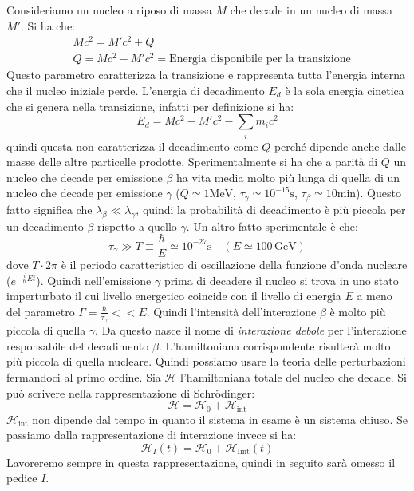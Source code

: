 Consideriamo un nucleo a riposo di massa $M$ che decade in un nucleo di massa 
$M'$. Si ha che:
\begin{align*}
&Mc^2=M'c^2+Q\\
&Q=Mc^2-M'c^2=\text{Energia disponibile per la transizione}
\end{align*}
Questo parametro caratterizza la transizione e rappresenta tutta l'energia 
interna che il nucleo iniziale perde. L'energia di decadimento $E_d$ è la sola 
energia cinetica
che si genera nella transizione, infatti per definizione si ha:
\[
E_d=Mc^2-M'c^2-\sum_i m_ic^2
\]
quindi questa non caratterizza il decadimento come $Q$ perché dipende anche 
dalle masse delle altre particelle prodotte. Sperimentalmente si ha che a 
parità di $Q$ un nucleo che decade
per emissione $\beta$ ha vita media molto più lunga di quella di un nucleo che 
decade per emissione $\gamma$ ($Q\simeq1\si{\mega\electronvolt}$, 
$\tau_{\gamma}\simeq10^{-15}\si{\second}$,
$\tau_{\beta}\simeq10\text{min}$).
Questo fatto significa che $\lambda_{\beta}\ll\lambda_{\gamma}$, quindi la 
probabilità di decadimento è più piccola per un decadimento $\beta$ rispetto 
a quello $\gamma$.
Un altro fatto sperimentale è che:
\[
\tau_{\gamma}\gg 
T\equiv\frac{\hbar}{E}\simeq10^{-27}\si{\second}\quad(E\simeq100\,
\si{\giga\electronvolt})
\]
dove $T\cdot2\pi$ è il periodo caratteristico di oscillazione della funzione 
d'onda nucleare ($e^{-\frac{i}{\hbar}Et}$). Quindi nell'emissione $\gamma$ 
prima di decadere il nucleo
si trova in uno stato imperturbato il cui livello energetico coincide con il 
livello di energia $E$ a meno del parametro 
$\Gamma=\frac{\hbar}{\tau_{\gamma}}<<E$. Quindi l'intensità
dell'interazione $\beta$ è molto più piccola di quella $\gamma$. Da questo 
nasce il nome di \textit{interazione debole} per l'interazione responsabile del 
decadimento $\beta$.
L'hamiltoniana corrispondente risulterà molto più piccola di quella nucleare. 
Quindi possiamo usare la teoria delle perturbazioni fermandoci al primo ordine.
Sia $\mathcal{H}$ l'hamiltoniana totale del nucleo che decade. Si può scrivere 
nella rappresentazione di Schr\"{o}dinger:
\[
\mathcal{H}=\mathcal{H}_0+\mathcal{H}_{\text{int}}
\]
$\mathcal{H}_{\text{int}}$ non dipende dal tempo in quanto il sistema in esame 
è un sistema chiuso. Se passiamo dalla rappresentazione di interazione invece 
si ha:
\[
\mathcal{H}_I(t)=\mathcal{H}_0+\mathcal{H}_{\text{Iint}}(t)
\]
Lavoreremo sempre in questa rappresentazione, quindi in seguito sarà omesso il 
pedice $I$.

